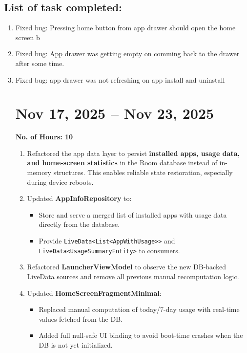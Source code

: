 \documentclass[12pt]{article}
\begin{document}
    \subsection{List of task completed:}
    \begin{enumerate}
        \item Fixed bug: Pressing home button from app drawer should open the home screen b
        \item Fixed bug: App drawer was getting empty on comming back to the drawer after some time.
        \item Fixed bug: app drawer was not refreshing on app install and uninstall
     \section{Nov 17, 2025 -- Nov 23, 2025}
    \textbf{No. of Hours: 10}
    
    \begin{enumerate}
        \item Refactored the app data layer to persist \textbf{installed apps, usage data, and home-screen statistics} in the Room database instead of in-memory structures. This enables reliable state restoration, especially during device reboots.
        
        \item Updated \textbf{AppInfoRepository} to:
        \begin{itemize}
            \item Store and serve a merged list of installed apps with usage data directly from the database.
            \item Provide \texttt{LiveData<List<AppWithUsage>>} and \texttt{LiveData<UsageSummaryEntity>} to consumers.
        \end{itemize}
    
        \item Refactored \textbf{LauncherViewModel} to observe the new DB-backed LiveData sources and remove all previous manual recomputation logic.
    
        \item Updated \textbf{HomeScreenFragmentMinimal}:
        \begin{itemize}
            \item Replaced manual computation of today/7-day usage with real-time values fetched from the DB.
            \item Added full null-safe UI binding to avoid boot-time crashes when the DB is not yet initialized.
        \end{itemize}
    

\end{enumerate}
\end{enumerate}
\end{document}
